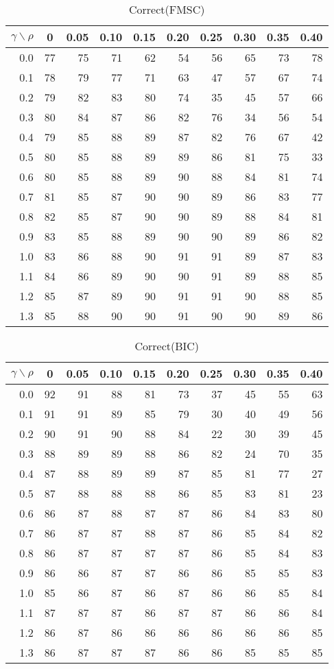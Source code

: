 \documentclass[12pt]{article}
\begin{document}
%
\begin{table}[!tbp]
\caption{Correct(FMSC)}
 \begin{center}
 \begin{tabular}{r|rrrrrrrrr}\hline\hline
\multicolumn{1}{c|}{$\gamma\backslash\rho$}&\multicolumn{1}{c}{0}&\multicolumn{1}{c}{0.05}&\multicolumn{1}{c}{0.10}&\multicolumn{1}{c}{0.15}&\multicolumn{1}{c}{0.20}&\multicolumn{1}{c}{0.25}&\multicolumn{1}{c}{0.30}&\multicolumn{1}{c}{0.35}&\multicolumn{1}{c}{0.40}\tabularnewline
\hline
0.0&77&75&71&62&54&56&65&73&78\tabularnewline
0.1&78&79&77&71&63&47&57&67&74\tabularnewline
0.2&79&82&83&80&74&35&45&57&66\tabularnewline
0.3&80&84&87&86&82&76&34&56&54\tabularnewline
0.4&79&85&88&89&87&82&76&67&42\tabularnewline
0.5&80&85&88&89&89&86&81&75&33\tabularnewline
0.6&80&85&88&89&90&88&84&81&74\tabularnewline
0.7&81&85&87&90&90&89&86&83&77\tabularnewline
0.8&82&85&87&90&90&89&88&84&81\tabularnewline
0.9&83&85&88&89&90&90&89&86&82\tabularnewline
1.0&83&86&88&90&91&91&89&87&83\tabularnewline
1.1&84&86&89&90&90&91&89&88&85\tabularnewline
1.2&85&87&89&90&91&91&90&88&85\tabularnewline
1.3&85&88&90&90&91&90&90&89&86\tabularnewline
\hline
\end{tabular}

\end{center}

\end{table}

%
\begin{table}[!tbp]
\caption{Correct(BIC)}
 \begin{center}
 \begin{tabular}{r|rrrrrrrrr}\hline\hline
\multicolumn{1}{c|}{$\gamma\backslash\rho$}&\multicolumn{1}{c}{0}&\multicolumn{1}{c}{0.05}&\multicolumn{1}{c}{0.10}&\multicolumn{1}{c}{0.15}&\multicolumn{1}{c}{0.20}&\multicolumn{1}{c}{0.25}&\multicolumn{1}{c}{0.30}&\multicolumn{1}{c}{0.35}&\multicolumn{1}{c}{0.40}\tabularnewline
\hline
0.0&92&91&88&81&73&37&45&55&63\tabularnewline
0.1&91&91&89&85&79&30&40&49&56\tabularnewline
0.2&90&91&90&88&84&22&30&39&45\tabularnewline
0.3&88&89&89&88&86&82&24&70&35\tabularnewline
0.4&87&88&89&89&87&85&81&77&27\tabularnewline
0.5&87&88&88&88&86&85&83&81&23\tabularnewline
0.6&86&87&88&87&87&86&84&83&80\tabularnewline
0.7&86&87&87&88&87&86&85&84&82\tabularnewline
0.8&86&87&87&87&87&86&85&84&83\tabularnewline
0.9&86&86&87&87&86&86&85&85&83\tabularnewline
1.0&85&86&87&86&87&86&86&85&84\tabularnewline
1.1&87&87&87&86&87&87&86&86&84\tabularnewline
1.2&86&87&86&86&86&86&86&86&85\tabularnewline
1.3&86&87&87&87&86&86&85&85&85\tabularnewline
\hline
\end{tabular}

\end{center}

\end{table}
\end{document}
